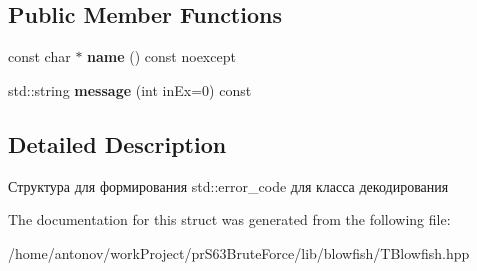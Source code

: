 \subsection*{Public Member Functions}
\begin{DoxyCompactItemize}
\item 
\mbox{\label{structblowfish_lib_1_1blowfish_exeption_1_1_t_blowfish_exeption_category_a92923b786609d0b69a7ce3ab709d0e2c}} 
const char $\ast$ {\bfseries name} () const noexcept
\item 
\mbox{\label{structblowfish_lib_1_1blowfish_exeption_1_1_t_blowfish_exeption_category_ac1f3b94e050e69b92bd51af85b9f8ea6}} 
std\+::string {\bfseries message} (int in\+Ex=0) const
\end{DoxyCompactItemize}


\subsection{Detailed Description}
Структура для формирования std\+::error\+\_\+code для класса декодирования 

The documentation for this struct was generated from the following file\+:\begin{DoxyCompactItemize}
\item 
/home/antonov/work\+Project/pr\+S63\+Brute\+Force/lib/blowfish/T\+Blowfish.\+hpp\end{DoxyCompactItemize}
